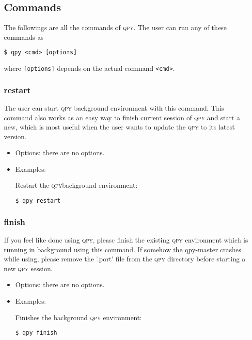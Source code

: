 \documentclass[a4paper,12pt]{article}
\newcommand{\qpy}{\textsc{qpy}}
\begin{document}
\subsection{Commands}\label{sec:commands}


The followings are all the commands of \qpy{}.
The user can run any of these commands as

\begin{lstlisting}[style=BashStyle]
$ qpy <cmd> [options]
\end{lstlisting}

where \texttt{[options]} depends on the actual command \texttt{<cmd>}.


\subsubsection{restart}

The user can start \qpy{} background environment with this command.
This command also works as an easy way to finish current session of \qpy{} and start a new, which is most useful when the user wants to update the \qpy{} to its latest version.

\begin{itemize}
\item Options:
  there are no options.

\item Examples:

  Restart the \qpy background environment:

\begin{lstlisting}[style=BashStyle]
$ qpy restart
\end{lstlisting}

\end{itemize}  

\subsubsection{finish}

If you feel like done using \qpy{}, please finish the existing \qpy{} environment which is running in background using this command.
If somehow the qpy-master crashes while using, please remove the '.port' file from the \qpy{} directory before starting a new \qpy{} session. 

\begin{itemize}
\item Options:
  there are no options.
  
\item Examples:
  
  Finishes the background \qpy{} environment:

\begin{lstlisting}[style=BashStyle]
$ qpy finish
\end{lstlisting}
  
\end{itemize}
\end{document}
